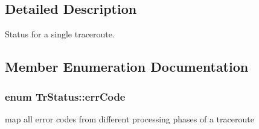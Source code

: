 \subsection{Detailed Description}
Status for a single traceroute. 

\subsection{Member Enumeration Documentation}
\hypertarget{classTrStatus_366057e7e0cc467a592518e5f0da5302}{
\subsubsection[errCode]{\setlength{\rightskip}{0pt plus 5cm}enum {\bf TrStatus::errCode}}}
\label{classTrStatus_366057e7e0cc467a592518e5f0da5302}


map all error codes from different processing phases of a traceroute 

